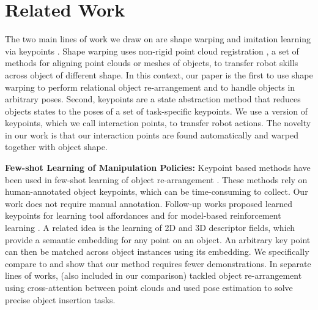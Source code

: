 \documentclass{article}
\begin{document}
\section{Related Work}

The two main lines of work we draw on are shape warping \cite{rodriguez18transferring,thompson21shapebased} and imitation learning via keypoints \cite{manuelli19kpam}. Shape warping uses non-rigid point cloud registration \cite{huang21comprehensive}, a set of methods for aligning point clouds or meshes of objects, to transfer robot skills across object of different shape. In this context, our paper is the first to use shape warping to perform relational object re-arrangement and to handle objects in arbitrary poses. Second, keypoints are a state abstraction method that reduces objects states to the poses of a set of task-specific keypoints.
We use a version of keypoints, which we call interaction points, to transfer robot actions. The novelty in our work is that our interaction points are found automatically and warped together with object shape.

\textbf{Few-shot Learning of Manipulation Policies:} Keypoint based methods have been used in few-shot learning of object re-arrangement \cite{manuelli19kpam,gao21kpam,gao21kpamsc}. These methods rely on human-annotated object keypoints, which can be time-consuming to collect. Our work does not require manual annotation. Follow-up works proposed learned keypoints for learning tool affordances \cite{qin20keto,vecerik20s3k,turpin21gift} and for model-based reinforcement learning \cite{manuelli20keypoints}. A related idea is the learning of 2D \cite{florence18dense} and 3D \cite{simeonov22neural,simeonov22se,ryu22equivariant,chun23local} descriptor fields, which provide a semantic embedding for any point on an object. An arbitrary key point can then be matched across object instances using its embedding. We specifically compare to \citet{simeonov22neural,simeonov22se} and show that our method requires fewer demonstrations. In separate lines of works, \citet{pan22taxpose} (also included in our comparison) tackled object re-arrangement using cross-attention \cite{vaswani17attention} between point clouds and \citet{wen22you} used pose estimation to solve precise object insertion tasks. %
\end{document}
